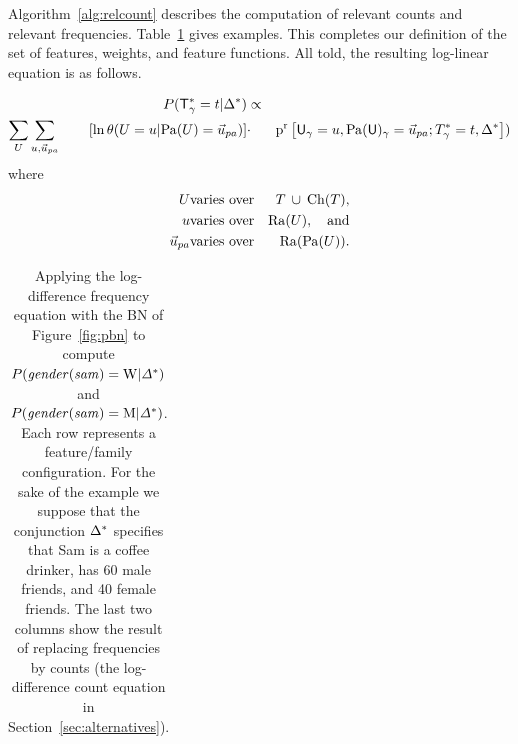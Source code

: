 \documentclass[twoside,11pt]{article}
\begin{document}
%

Algorithm~\ref{alg:relcount} describes the computation of relevant counts and relevant frequencies. Table~\ref{table:log-diff-example} gives examples. 
This completes our definition of the set of features, weights, and feature functions. All told, the resulting log-linear equation is as follows.





\begin{definition}\label{def:log-diff-freq-eq}
\begin{eqnarray*}
  \Gprob{\FG{\Ground{\TI}} = \TV} {\QC} &\propto &  \\
 \sum_{\UT} \sum_{\UV,\Prange{\UT}}   
\qquad \left[ \ln \cprob{\UT = \UV}{\Pa{\UT} = \Prange{\UT}} \right] &
    \cdot &
    \Relfreq{\Appendterm{\Ground{\UI}  = \UV} {\Ground{\Pa{\UI}} = \Prange{\UT}}} {\Qconj})
\end{eqnarray*}
where 
\begin{eqnarray*}
\UT &\mbox{varies over} &  \Setaddterm{\TT} {\Ch{\TT}}, \\
\UV & \mbox{varies over} & \Range{\UT}, \quad\mbox{and}\\
\Prange{\UT} & \mbox{varies over} &  \Range{\Pa{\UT}}.
\end{eqnarray*}
\end{definition}


\begin{table}

\begin{tabular}{lrlrrrr|rr}

\end{tabular}
\caption{Applying the log-difference frequency equation with the BN of Figure~\ref{fig:pbn} to compute $P(\it{gender}(sam) = \mathrm{W} | \Delta^{*}\hspace{0.0ex})$ and $P(\it{gender}(sam) = \mathrm{M} | \Delta^{*}\hspace{0.0ex})$. Each row represents a feature/family configuration. For the sake of the example we suppose that the conjunction $\Delta^{*}\hspace{0.0ex}$ specifies that Sam is a coffee drinker, has 60 male friends, and 40 female friends.
The last two columns show the result of replacing frequencies by counts (the log-difference count equation in Section~\ref{sec:alternatives}).}
\label{table:log-diff-example}
\end{table}
\end{document}
